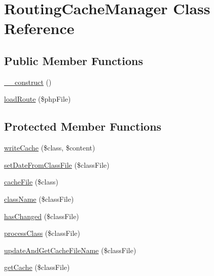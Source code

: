 \hypertarget{class_router_1_1_routing_cache_manager}{\section{Routing\-Cache\-Manager Class Reference}
\label{class_router_1_1_routing_cache_manager}
}
\subsection*{Public Member Functions}
\begin{DoxyCompactItemize}
\item 
\hyperlink{class_router_1_1_routing_cache_manager_a095c5d389db211932136b53f25f39685}{\-\_\-\-\_\-construct} ()
\item 
\hyperlink{class_router_1_1_routing_cache_manager_ab0bace56d1c55c21f8d3772b4cdb3bcc}{load\-Route} (\$php\-File)
\end{DoxyCompactItemize}
\subsection*{Protected Member Functions}
\begin{DoxyCompactItemize}
\item 
\hyperlink{class_router_1_1_routing_cache_manager_acbcdfb5693f57bebd6c9d410697eb73a}{write\-Cache} (\$class, \$content)
\item 
\hyperlink{class_router_1_1_routing_cache_manager_a992eb7298b7974f836a8ff5a025ae645}{set\-Date\-From\-Class\-File} (\$class\-File)
\item 
\hyperlink{class_router_1_1_routing_cache_manager_a960917f79249e282ca5adc375248c387}{cache\-File} (\$class)
\item 
\hyperlink{class_router_1_1_routing_cache_manager_a95f3d2c5621ff3d1b5a8bc2f4190a419}{class\-Name} (\$class\-File)
\item 
\hyperlink{class_router_1_1_routing_cache_manager_a072c2deeedd99b635401d74e3394874b}{has\-Changed} (\$class\-File)
\item 
\hyperlink{class_router_1_1_routing_cache_manager_a82ab69a0b3b635e4d979c50a5fb0aa8f}{process\-Class} (\$class\-File)
\item 
\hyperlink{class_router_1_1_routing_cache_manager_a3d89f62b3d1de0329c1cdf076899c746}{update\-And\-Get\-Cache\-File\-Name} (\$class\-File)
\item 
\hyperlink{class_router_1_1_routing_cache_manager_a77acc1985e70069c2dd1950f1cb3326e}{get\-Cache} (\$class\-File)
\end{DoxyCompactItemize}
